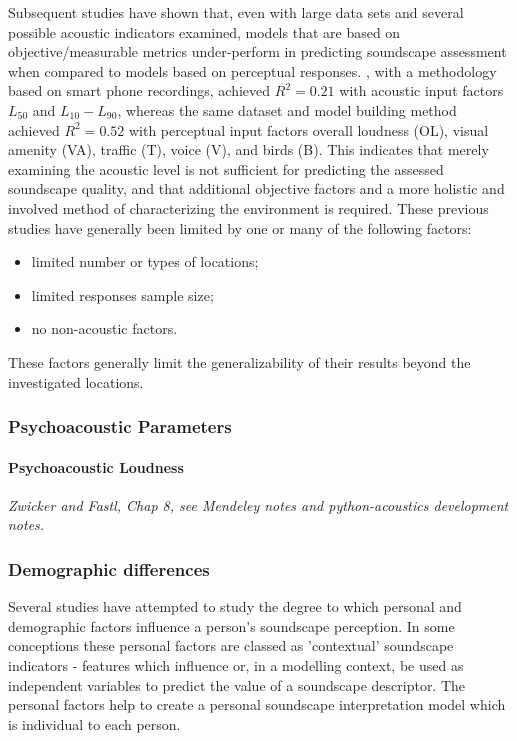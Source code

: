 Subsequent studies have shown that, even with large data sets and several possible acoustic indicators examined, models that are based on objective/measurable metrics under-perform in predicting soundscape assessment when compared to models based on perceptual responses. \citet{Ricciardi2015Sound}, with a methodology based on smart phone recordings, achieved $R^2 = 0.21$ with acoustic input factors $L_{50}$ and $L_{10} - L_{90}$, whereas the same dataset and model building method achieved $R^2 = 0.52$ with perceptual input factors overall loudness (OL), visual amenity (VA), traffic (T), voice (V), and birds (B). This indicates that merely examining the acoustic level is not sufficient for predicting the assessed soundscape quality, and that additional objective factors and a more holistic and involved method of characterizing the environment is required. These previous studies have generally been limited by one or many of the following factors:

\begin{itemize}
  \item limited number or types of locations;
  \item limited responses sample size;
  \item no non-acoustic factors.
\end{itemize}
These factors generally limit the generalizability of their results beyond the investigated locations.


\subsubsection{Psychoacoustic Parameters}


\paragraph{Psychoacoustic Loudness}
\emph{Zwicker and Fastl, Chap 8, see Mendeley notes and python-acoustics development notes.}

\subsubsection{Demographic differences}
Several studies have attempted to study the degree to which personal and demographic factors influence a person's soundscape perception. In some conceptions  %
these personal factors are classed as 'contextual' soundscape indicators - features which influence or, in a modelling context, be used as independent variables to predict the value of a soundscape descriptor. The personal factors help to create a personal soundscape interpretation model which is individual to each person.

